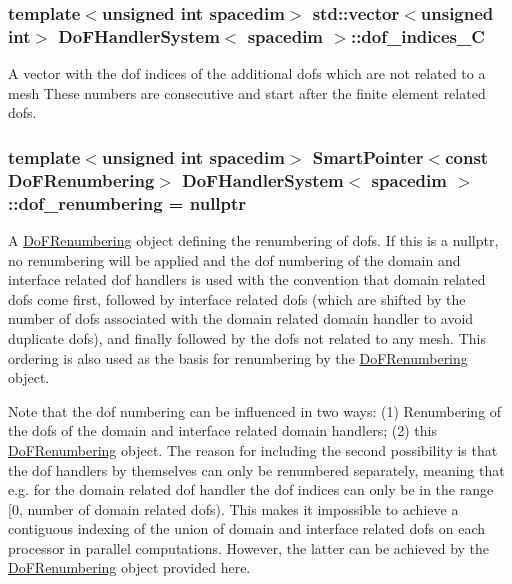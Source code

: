 \subsubsection[{\texorpdfstring{dof\+\_\+indices\+\_\+C}{dof_indices_C}}]{\setlength{\rightskip}{0pt plus 5cm}template$<$unsigned int spacedim$>$ std\+::vector$<$unsigned int$>$ {\bf Do\+F\+Handler\+System}$<$ spacedim $>$\+::dof\+\_\+indices\+\_\+C\hspace{0.3cm}{\ttfamily [private]}}\hypertarget{class_do_f_handler_system_a15c27ca30c5905b44691779c755cd69c}{}\label{class_do_f_handler_system_a15c27ca30c5905b44691779c755cd69c}
A vector with the dof indices of the additional dofs which are not related to a mesh These numbers are consecutive and start after the finite element related dofs. 
\subsubsection[{\texorpdfstring{dof\+\_\+renumbering}{dof_renumbering}}]{\setlength{\rightskip}{0pt plus 5cm}template$<$unsigned int spacedim$>$ {\bf Smart\+Pointer}$<$const {\bf Do\+F\+Renumbering}$>$ {\bf Do\+F\+Handler\+System}$<$ spacedim $>$\+::dof\+\_\+renumbering = nullptr\hspace{0.3cm}{\ttfamily [private]}}\hypertarget{class_do_f_handler_system_aef6159c606a24ac7daadcd3fe082b3b6}{}\label{class_do_f_handler_system_aef6159c606a24ac7daadcd3fe082b3b6}
A \hyperlink{class_do_f_renumbering}{Do\+F\+Renumbering} object defining the renumbering of dofs. If this is a {\ttfamily nullptr}, no renumbering will be applied and the dof numbering of the domain and interface related dof handlers is used with the convention that domain related dofs come first, followed by interface related dofs (which are shifted by the number of dofs associated with the domain related domain handler to avoid duplicate dofs), and finally followed by the dofs not related to any mesh. This ordering is also used as the basis for renumbering by the \hyperlink{class_do_f_renumbering}{Do\+F\+Renumbering} object.

Note that the dof numbering can be influenced in two ways\+: (1) Renumbering of the dofs of the domain and interface related domain handlers; (2) this \hyperlink{class_do_f_renumbering}{Do\+F\+Renumbering} object. The reason for including the second possibility is that the dof handlers by themselves can only be renumbered separately, meaning that e.\+g. for the domain related dof handler the dof indices can only be in the range \mbox{[}0, number of domain related dofs). This makes it impossible to achieve a contiguous indexing of the union of domain and interface related dofs on each processor in parallel computations. However, the latter can be achieved by the \hyperlink{class_do_f_renumbering}{Do\+F\+Renumbering} object provided here. 

